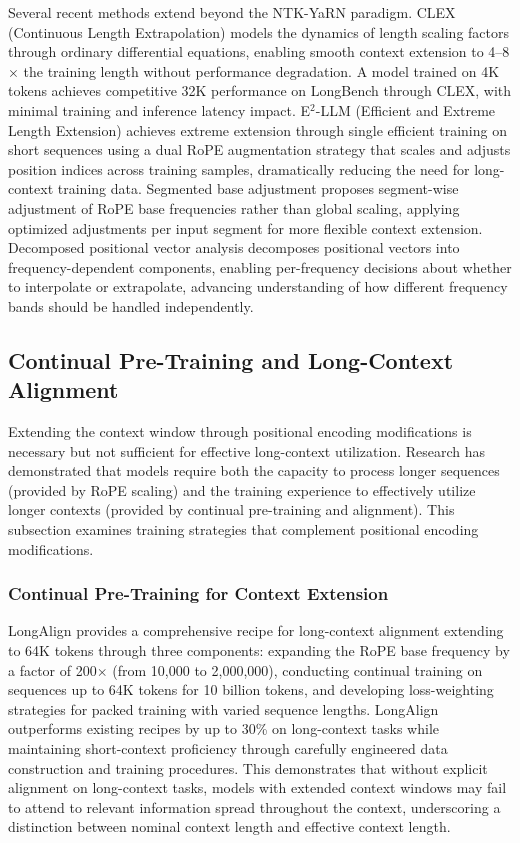 \documentclass[11pt,letterpaper]{article}
\begin{document}
Several recent methods extend beyond the NTK-YaRN paradigm. CLEX (Continuous Length Extrapolation) models the dynamics of length scaling factors through ordinary differential equations, enabling smooth context extension to 4--8$\times$ the training length without performance degradation. A model trained on 4K tokens achieves competitive 32K performance on LongBench through CLEX, with minimal training and inference latency impact. E$^2$-LLM (Efficient and Extreme Length Extension) achieves extreme extension through single efficient training on short sequences using a dual RoPE augmentation strategy that scales and adjusts position indices across training samples, dramatically reducing the need for long-context training data. Segmented base adjustment proposes segment-wise adjustment of RoPE base frequencies rather than global scaling, applying optimized adjustments per input segment for more flexible context extension. Decomposed positional vector analysis decomposes positional vectors into frequency-dependent components, enabling per-frequency decisions about whether to interpolate or extrapolate, advancing understanding of how different frequency bands should be handled independently.

\subsection{Continual Pre-Training and Long-Context Alignment}

Extending the context window through positional encoding modifications is necessary but not sufficient for effective long-context utilization. Research has demonstrated that models require both the capacity to process longer sequences (provided by RoPE scaling) and the training experience to effectively utilize longer contexts (provided by continual pre-training and alignment). This subsection examines training strategies that complement positional encoding modifications.

\subsubsection{Continual Pre-Training for Context Extension}

LongAlign \cite{longalign2024} provides a comprehensive recipe for long-context alignment extending to 64K tokens through three components: expanding the RoPE base frequency by a factor of 200$\times$ (from 10,000 to 2,000,000), conducting continual training on sequences up to 64K tokens for 10 billion tokens, and developing loss-weighting strategies for packed training with varied sequence lengths. LongAlign outperforms existing recipes by up to 30\% on long-context tasks while maintaining short-context proficiency through carefully engineered data construction and training procedures. This demonstrates that without explicit alignment on long-context tasks, models with extended context windows may fail to attend to relevant information spread throughout the context, underscoring a distinction between nominal context length and effective context length.
\end{document}
